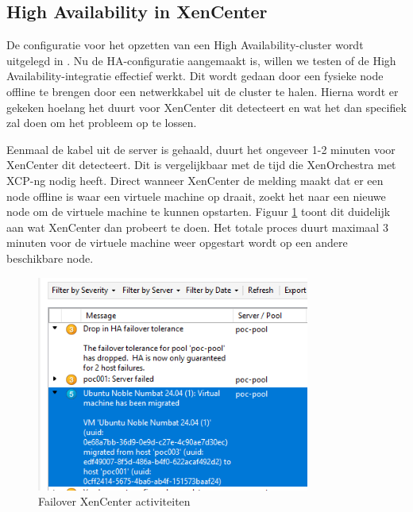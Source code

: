 \subsection{High Availability in XenCenter}%
De configuratie voor het opzetten van een High Availability-cluster wordt uitgelegd in .
Nu de HA-configuratie aangemaakt is, willen we testen of de High Availability-integratie effectief werkt. Dit wordt gedaan door een fysieke node offline te brengen door een netwerkkabel uit de cluster te halen.
Hierna wordt er gekeken hoelang het duurt voor XenCenter dit detecteert en wat het dan specifiek zal doen om het probleem op te lossen.

Eenmaal de kabel uit de server is gehaald, duurt het ongeveer 1-2 minuten voor XenCenter dit detecteert. Dit is vergelijkbaar met de tijd die XenOrchestra met XCP-ng nodig heeft.
Direct wanneer XenCenter de melding maakt dat er een node offline is waar een virtuele machine op draait, zoekt het naar een nieuwe node om de virtuele machine te kunnen opstarten.
Figuur \ref{fig:failover-xen} toont dit duidelijk aan wat XenCenter dan probeert te doen. Het totale proces duurt maximaal 3 minuten voor de virtuele machine weer opgestart wordt op een andere beschikbare node.
\begin{figure}[H]
\centering
\includegraphics[width=0.8\textwidth]{../poc/failover-xen.png}
\caption{Failover XenCenter activiteiten}
\label{fig:failover-xen}
\end{figure}

